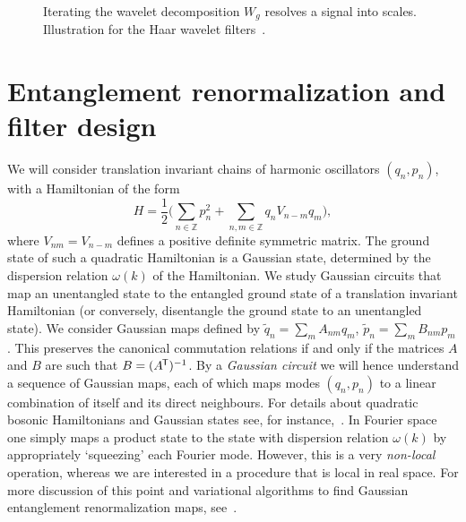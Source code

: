 \documentclass[submission, Phys]{SciPost}
\theoremstyle{definition}
\theoremstyle{remark}
\newcommand{\ZZ}{\mathbb Z}
\newcommand*{\tran}{{\mkern-1.5mu\mathsf{T}}}
\begin{document}
\begin{figure}
\centering
\quad{}
\caption{Iterating the wavelet decomposition $W_g$ resolves a signal into scales. Illustration for the Haar wavelet filters~\cite{witteveen2019quantum}.}
\label{fig:filterbank}
\end{figure}

\section{Entanglement renormalization and filter design}\label{sec:ent norm}
We will consider translation invariant chains of harmonic oscillators $(q_n, p_n)$, with a Hamiltonian of the form
\begin{equation}\label{eq:hamiltonian}
  H = \frac12\bigl(\sum_{n \in \ZZ} p_n^2 + \sum_{n, m \in \ZZ} q_n V_{n - m} q_m\bigr),
\end{equation}
where $V_{nm} = V_{n-m}$ defines a positive definite symmetric matrix.
The ground state of such a quadratic Hamiltonian is a Gaussian state, determined by the dispersion relation $\omega(k)$ of the Hamiltonian.
We study Gaussian circuits that map an unentangled state to the entangled ground state of a translation invariant Hamiltonian (or  conversely, disentangle the ground state to an unentangled state).
We consider Gaussian maps defined by $\tilde{q}_n = \sum_m A_{nm} q_m$, $\tilde{p}_n = \sum_m B_{nm} p_m$.
This preserves the canonical commutation relations if and only if the matrices $A$ and $B$ are such that $B = (A^\tran)^{-1}$.
By a \emph{Gaussian circuit} we will hence understand a sequence of Gaussian maps, each of which maps modes $(q_n, p_n)$ to a linear combination of itself and its direct neighbours.
For details about quadratic bosonic Hamiltonians and Gaussian states see, for instance,~\cite{audenaert2002entanglement,plenio2005entropy, walls2007quantum, knill2001scheme}.
In Fourier space one simply maps a product state to the state with dispersion relation $\omega(k)$ by appropriately `squeezing' each Fourier mode.
However, this is a very \emph{non-local} operation, whereas we are interested in a procedure that is local in real space.
For more discussion of this point and variational algorithms to find Gaussian entanglement renormalization maps, see~\cite{evenbly2010entanglement}.
\end{document}
